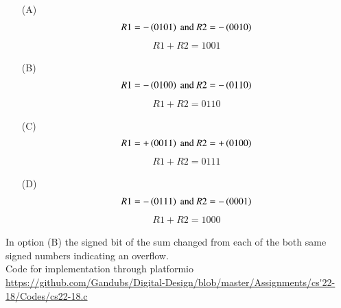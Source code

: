 \documentclass[journal,12pt,onecolumn]{IEEEtran}
\theoremstyle{remark}
\begin{document}
\begin{enumerate}
    \item [(A)]
    \begin{align}
R1 = -\left(0101\right) \text{ and } R2=-\left(0010\right)
\end{align}
\begin{align}
    R1 + R2 = 1001
\end{align}

    \item [(B)]
    \begin{align}
R1 = -\left(0100\right) \text{ and } R2=-\left(0110\right)
\end{align}
\begin{align}
    R1 + R2 = 0110
\end{align}

    \item [(C)]
    \begin{align}
R1 = +\left(0011\right) \text{ and } R2=+\left(0100\right)
\end{align}
\begin{align}
    R1 + R2 = 0111
\end{align}

    \item [(D)]
    \begin{align}
R1 = -\left(0111\right) \text{ and } R2=-\left(0001\right)
\end{align}
\begin{align}
    R1 + R2 = 1000
\end{align}
\end{enumerate}
In option (B) the signed bit of the sum changed from each of the both same signed numbers indicating an overflow.\\
Code for implementation through platformio\\
\url{https://github.com/Gandubs/Digital-Design/blob/master/Assignments/cs'22-18/Codes/cs22-18.c}
 
\end{document}

